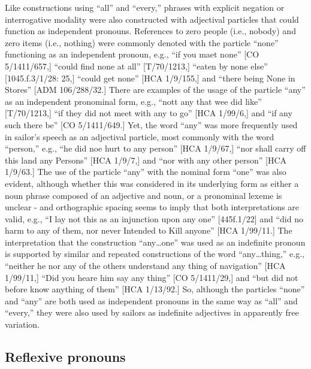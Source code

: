   Like constructions using “all” and “every,” phrases with explicit negation or interrogative modality were also constructed with adjectival particles that could function as independent pronouns. References to zero people (i.e., nobody) and zero items (i.e., nothing) were commonly denoted with the particle “none” functioning as an independent pronoun, e.g., “if you maet none” [CO 5/1411/657,] “could find none at all” [T/70/1213,] “eaten by none else” [1045.f.3/1/28: 25,] “could get none” [HCA 1/9/155,] and “there being None in Stores” [ADM 106/288/32.] There are examples of the usage of the particle “any” as an independent pronominal form, e.g., “nott any that wee did like” [T/70/1213,] “if they did not meet with any to go” [HCA 1/99/6,] and “if any such there be” [CO 5/1411/649.] Yet, the word “any” was more frequently used in sailor’s speech as an adjectival particle, most commonly with the word “person,” e.g., “he did noe hurt to any person” [HCA 1/9/67,] “nor shall carry off this land any Persons” [HCA 1/9/7,] and “nor with any other person” [HCA 1/9/63.] The use of the particle “any” with the nominal form “one” was also evident, although whether this was considered in its underlying form as either a noun phrase composed of an adjective and noun, or a pronominal lexeme is unclear - and orthographic spacing seems to imply that both interpretations are valid, e.g., “I lay not this as an injunction upon any one” [445f.1/22] and “did no harm to any of them, nor never Intended to Kill anyone” [HCA 1/99/11.] The interpretation that the construction “any…one” was used as an indefinite pronoun is supported by similar and repeated constructions of the word “any…thing,” e.g., “neither he nor any of the others understand any thing of navigation” [HCA 1/99/11,] “Did you heare him say any thing” [CO 5/1411/29,] and “but did not before know anything of them” [HCA 1/13/92.] So, although the particles “none” and “any” are both used as independent pronouns in the same way as “all” and “every,” they were also used by sailors as indefinite adjectives in apparently free variation.

\subsection{{Reflexive} {pronouns}}%

